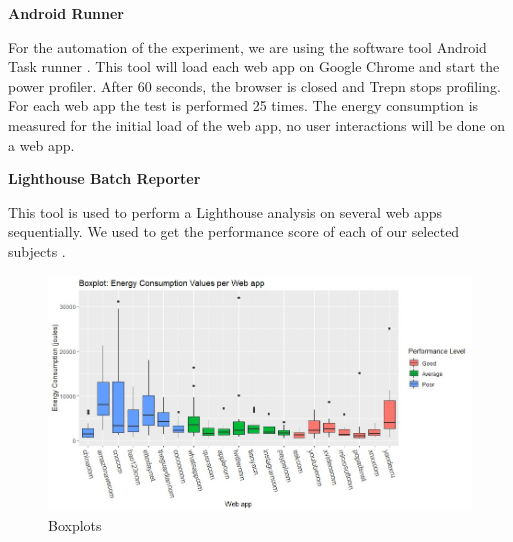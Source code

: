 \textbf{Android Runner}

For the automation of the experiment, we are using the software tool Android Task runner \cite{WEBSITE:10}. This tool will load each web app on Google Chrome and start the power profiler. After 60 seconds, the browser is closed and Trepn stops profiling. For each web app the test is performed 25 times. The energy consumption is measured for the initial load of the web app, no user interactions will be done on a web app.
\newline


\textbf{Lighthouse Batch Reporter}

This tool is used to perform a Lighthouse analysis on several web apps sequentially. We used to get the performance score of each of our selected subjects \cite{WEBSITE:12}.

\begin{figure}
  \includegraphics[width=\textwidth]{./Images/boxplot-allecv.jpg}
  \caption{Boxplots}
  \label{fig:boxplots-all}
\end{figure}